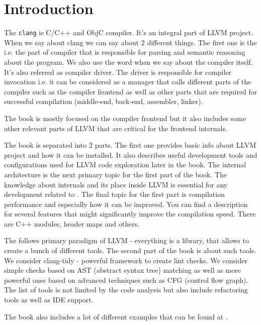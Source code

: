 \chapter{Introduction}

The \texttt{clang} is C/C++ and ObjC compiler. It's an
integral part of LLVM 
project. When we say about clang we can say about 2 different
things. The first one is the  i.e. the part of
compiler that is responsible for parsing and semantic reasoning about
the program. We also use the word \clang when we say
about the compiler itself. It's also referred as compiler driver. The
driver is responsible for compiler invocation i.e. it can be
considered as a manager that calls different parts of the
compiler such as the compiler
frontend as well as other parts that are required for successful
compilation (middle-end, back-end, assembler, linker).

The book is mostly focused on the \clang compiler
frontend but it also includes some other relevant parts of
LLVM that are critical for the frontend internals.

The book is separated into 2 parts. The first one provides basic
info about LLVM project and how it can be installed. It also describes
useful development tools and configurations used for LLVM code
exploration later in the book. The internal \clang architecture is the next
primary topic for the first part of the book. The knowledge about \clang
internals and its place inside LLVM is essential for any development related to
\clang. The final topic for the first part is compilation performance and
especially how it can be improved. You can find a description for several \clang
features that might significantly improve the compilation speed. There are C++ modules, header maps and others.

The \clang follows primary paradigm of LLVM -
everything is a library, that allows to create a bunch of different
tools. The second part of the book is about such tools. We consider clang-tidy -
powerful framework to create lint checks. We consider simple checks based on AST
(abstract syntax tree) matching as well as more powerful ones based on advanced
techniques such as CFG (control flow graph). The list of tools is not limited by
the code analysis but also include refactoring tools as well as IDE support.


The book also includes a lot of different examples that can be found at
\cite{github:clangbook_src}.
